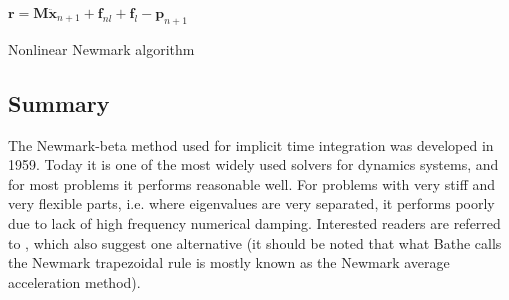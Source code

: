 \begin{algorithm}
{{    $\bm r = \bm M \ddot{\bm x}_{n+1} + \bm f_{nl} + \bm f_{l} -  \bm p_{n+1}$
  }
}
  \caption{Nonlinear Newmark algorithm}
  \label{algo:nonlin_newmark}
\end{algorithm}

\subsection{Summary}
\label{sec:newmark_summary}

The Newmark-beta method used for implicit time integration was developed in
1959. Today it is one of the most widely used solvers for dynamics systems, and
for most problems it performs reasonable well. For problems with very stiff and
very flexible parts, i.e. where eigenvalues are very separated, it performs
poorly due to lack of high frequency numerical damping. Interested readers are
referred to \cite{bathe2012a}, which also suggest one alternative (it should be
noted that what Bathe calls the Newmark trapezoidal rule is mostly known as the
Newmark average acceleration method).



